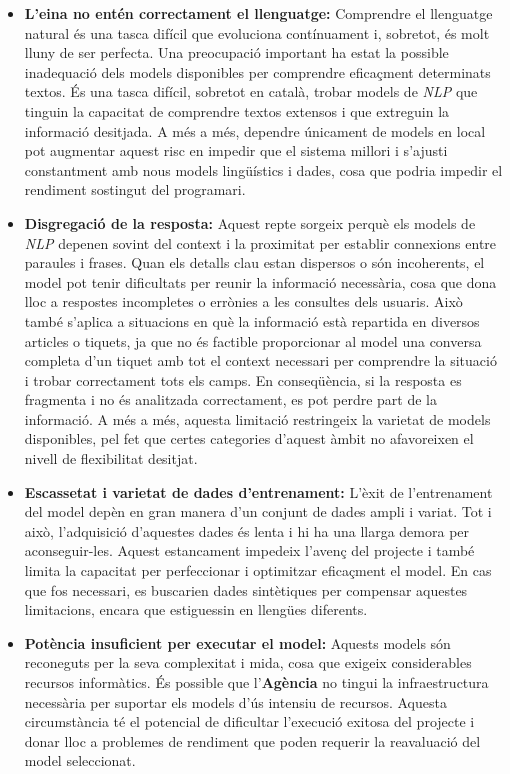 \begin{itemize}
    \item \textbf{L'eina no entén correctament el llenguatge:} Comprendre el llenguatge natural és una tasca difícil que evoluciona contínuament i, sobretot, és molt lluny de ser perfecta. Una preocupació important ha estat la possible inadequació dels models disponibles per comprendre eficaçment determinats textos. És una tasca difícil, sobretot en català, trobar models de \textit{NLP} que tinguin la capacitat de comprendre textos extensos i que extreguin la informació desitjada. A més a més, dependre únicament de models en local pot augmentar aquest risc en impedir que el sistema millori i s'ajusti constantment amb nous models lingüístics i dades, cosa que podria impedir el rendiment sostingut del programari.
    \item \textbf{Disgregació de la resposta:} Aquest repte sorgeix perquè els models de \textit{NLP} depenen sovint del context i la proximitat per establir connexions entre paraules i frases. Quan els detalls clau estan dispersos o són incoherents, el model pot tenir dificultats per reunir la informació necessària, cosa que dona lloc a respostes incompletes o errònies a les consultes dels usuaris. Això també s'aplica a situacions en què la informació està repartida en diversos articles o tiquets, ja que no és factible proporcionar al model una conversa completa d'un tiquet amb tot el context necessari per comprendre la situació i trobar correctament tots els camps. En conseqüència, si la resposta es fragmenta i no és analitzada correctament, es pot perdre part de la informació. A més a més, aquesta limitació restringeix la varietat de models disponibles, pel fet que certes categories d'aquest àmbit no afavoreixen el nivell de flexibilitat desitjat.
    \item \textbf{Escassetat i varietat de dades d'entrenament:} L'èxit de l'entrenament del model depèn en gran manera d'un conjunt de dades ampli i variat. Tot i això, l'adquisició d'aquestes dades és lenta i hi ha una llarga demora per aconseguir-les. Aquest estancament impedeix l'avenç del projecte i també limita la capacitat per perfeccionar i optimitzar eficaçment el model. En cas que fos necessari, es buscarien dades sintètiques per compensar aquestes limitacions, encara que estiguessin en llengües diferents.
    \item \textbf{Potència insuficient per executar el model:} Aquests models són reconeguts per la seva complexitat i mida, cosa que exigeix considerables recursos informàtics. És possible que l'\textbf{Agència} no tingui la infraestructura necessària per suportar els models d'ús intensiu de recursos. Aquesta circumstància té el potencial de dificultar l'execució exitosa del projecte i donar lloc a problemes de rendiment que poden requerir la reavaluació del model seleccionat.

\end{itemize}
